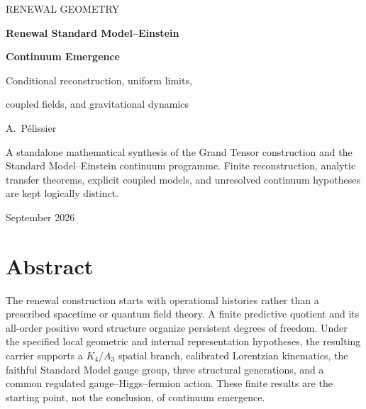\documentclass[11pt,a4paper,oneside]{book}
\theoremstyle{plain}
\theoremstyle{definition}
\theoremstyle{remark}
\begin{document}
\frontmatter
\begin{titlepage}
\centering
\vspace*{18mm}
{\small RENEWAL GEOMETRY\par}
\vspace{13mm}
{\Huge\bfseries Renewal Standard Model--Einstein\par}
\vspace{4mm}
{\Huge\bfseries Continuum Emergence\par}
\vspace{13mm}
{\Large Conditional reconstruction, uniform limits,\par coupled fields, and gravitational dynamics\par}
\vspace{17mm}
{\large A.\ P\'elissier\par}
\vfill
\begin{minipage}{0.81\textwidth}
\small
A standalone mathematical synthesis of the Grand Tensor construction and the Standard Model--Einstein continuum programme. Finite reconstruction, analytic transfer theorems, explicit coupled models, and unresolved continuum hypotheses are kept logically distinct.
\end{minipage}
\vspace{14mm}
\par September 2026
\end{titlepage}
\chapter*{Abstract}
The renewal construction starts with operational histories rather than a prescribed spacetime or quantum field theory. A finite predictive quotient and its all-order positive word structure organize persistent degrees of freedom. Under the specified local geometric and internal representation hypotheses, the resulting carrier supports a $K_4/A_3$ spatial branch, calibrated Lorentzian kinematics, the faithful Standard Model gauge group, three structural generations, and a common regulated gauge--Higgs--fermion action. These finite results are the starting point, not the conclusion, of continuum emergence.
\end{document}
